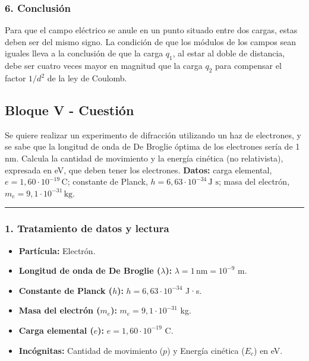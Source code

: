 \subsubsection*{6. Conclusión}
\begin{cajaconclusion}
Para que el campo eléctrico se anule en un punto situado entre dos cargas, estas deben ser del mismo signo. La condición de que los módulos de los campos sean iguales lleva a la conclusión de que la carga $q_1$, al estar al doble de distancia, debe ser cuatro veces mayor en magnitud que la carga $q_2$ para compensar el factor $1/d^2$ de la ley de Coulomb.
\end{cajaconclusion}

\newpage
\subsection{Bloque V - Cuestión}
\label{subsec:B5_2014_jun_ord}

\begin{cajaenunciado}
Se quiere realizar un experimento de difracción utilizando un haz de electrones, y se sabe que la longitud de onda de De Broglie óptima de los electrones sería de 1 nm. Calcula la cantidad de movimiento y la energía cinética (no relativista), expresada en eV, que deben tener los electrones.
\textbf{Datos:} carga elemental, $e=1,60\cdot10^{-19}\,\text{C}$; constante de Planck, $h=6,63\cdot10^{-34}\,\text{J s}$; masa del electrón, $m_e=9,1\cdot10^{-31}\,\text{kg}$.
\end{cajaenunciado}
\hrule

\subsubsection*{1. Tratamiento de datos y lectura}
\begin{itemize}
    \item \textbf{Partícula:} Electrón.
    \item \textbf{Longitud de onda de De Broglie ($\lambda$):} $\lambda = 1 \, \text{nm} = 10^{-9}$ m.
    \item \textbf{Constante de Planck ($h$):} $h = 6,63 \cdot 10^{-34}$ J·s.
    \item \textbf{Masa del electrón ($m_e$):} $m_e = 9,1 \cdot 10^{-31}$ kg.
    \item \textbf{Carga elemental ($e$):} $e = 1,60 \cdot 10^{-19}$ C.
    \item \textbf{Incógnitas:} Cantidad de movimiento ($p$) y Energía cinética ($E_c$) en eV.
\end{itemize}

